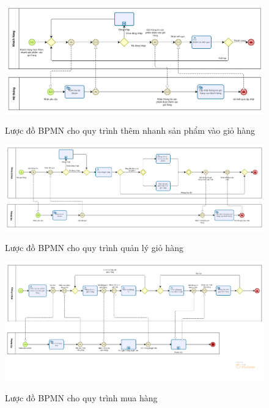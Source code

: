     \begin{figure}[!htp]
        \centering
        \includegraphics[width=17cm]{img/BPMN/customer_buy/customer_add_fast.png}
        \label{4}
        \newline
        \caption{Lược đồ BPMN cho quy trình thêm nhanh sản phẩm vào giỏ hàng}
    \end{figure}
    \begin{figure}[!htp]
        \centering
        \includegraphics[width=17cm]{img/BPMN/customer_buy/customer_cart.png}
        \label{4}
        \newline
        \caption{Lược đồ BPMN cho quy trình quản lý giỏ hàng}
    \end{figure}
    \begin{figure}[!htp]
        \centering
        \includegraphics[width=17cm]{img/BPMN/customer_buy/customer_buy_order.png}
        \label{4}
        \newline
        \caption{Lược đồ BPMN cho quy trình mua hàng}
    \end{figure}
